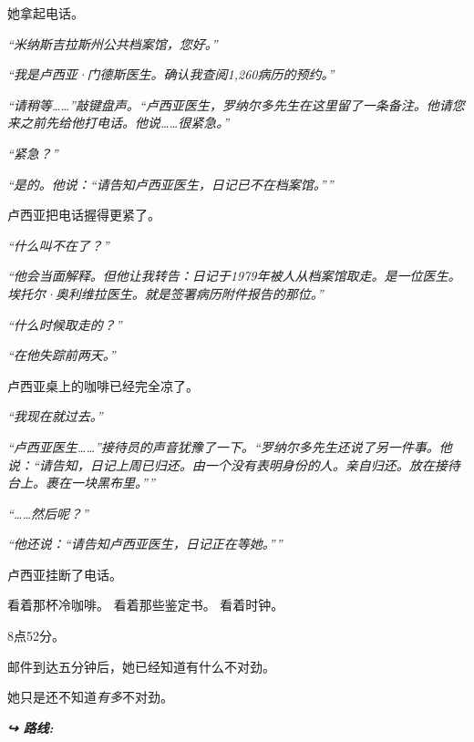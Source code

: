 \noindent 她拿起电话。

\noindent \textit{\textquotedblleft{}米纳斯吉拉斯州公共档案馆，您好。\textquotedblright{}}

\noindent \textit{\textquotedblleft{}我是卢西亚·门德斯医生。确认我查阅1,260病历的预约。\textquotedblright{}}

\noindent \textit{\textquotedblleft{}请稍等……\textquotedblright{}敲键盘声。\textquotedblleft{}卢西亚医生，罗纳尔多先生在这里留了一条备注。他请您来之前先给他打电话。他说……很紧急。\textquotedblright{}}

\noindent \textit{\textquotedblleft{}紧急？\textquotedblright{}}

\noindent \textit{\textquotedblleft{}是的。他说：\textquotedblleft{}请告知卢西亚医生，日记已不在档案馆。\textquotedblright{}\textquotedblright{}}

\noindent 卢西亚把电话握得更紧了。

\noindent \textit{\textquotedblleft{}什么叫不在了？\textquotedblright{}}

\noindent \textit{\textquotedblleft{}他会当面解释。但他让我转告：日记于1979年被人从档案馆取走。是一位医生。埃托尔·奥利维拉医生。就是签署病历附件报告的那位。\textquotedblright{}}

\noindent \textit{\textquotedblleft{}什么时候取走的？\textquotedblright{}}

\noindent \textit{\textquotedblleft{}在他失踪前两天。\textquotedblright{}}

\noindent 卢西亚桌上的咖啡已经完全凉了。

\noindent \textit{\textquotedblleft{}我现在就过去。\textquotedblright{}}

\noindent \textit{\textquotedblleft{}卢西亚医生……\textquotedblright{}接待员的声音犹豫了一下。\textquotedblleft{}罗纳尔多先生还说了另一件事。他说：\textquotedblleft{}请告知，日记上周已归还。由一个没有表明身份的人。亲自归还。放在接待台上。裹在一块黑布里。\textquotedblright{}\textquotedblright{}}

\noindent \textit{\textquotedblleft{}……然后呢？\textquotedblright{}}

\noindent \textit{\textquotedblleft{}他还说：\textquotedblleft{}请告知卢西亚医生，日记正在等她。\textquotedblright{}\textquotedblright{}}

\noindent 卢西亚挂断了电话。

\noindent 看着那杯冷咖啡。
\noindent 看着那些鉴定书。
\noindent 看着时钟。

\noindent 8点52分。

\noindent 邮件到达五分钟后，她已经知道有什么不对劲。

\noindent 她只是还不知道\textit{有多}不对劲。

\vspace{0.5em}
\noindent\textit{\textbf{↪ 路线:}  \rotasep {}}

